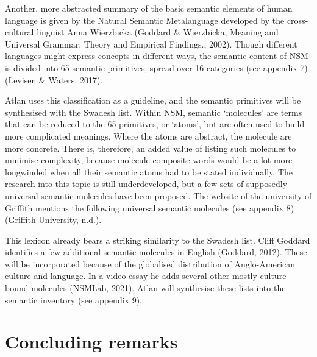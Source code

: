 Another, more abstracted summary of the basic semantic elements of human language is given by the Natural Semantic Metalanguage developed by the cross-cultural linguist Anna Wierzbicka (Goddard \& Wierzbicka, Meaning and Universal Grammar: Theory and Empirical Findings., 2002). Though different languages might express concepts in different ways, the semantic content of NSM is divided into 65 semantic primitives, spread over 16 categories (see appendix 7) (Levisen \& Waters, 2017). 

Atlan uses this classification as a guideline, and the semantic primitives will be synthesised with the Swadesh list. Within NSM, semantic ‘molecules’ are terms that can be reduced to the 65 primitives, or ‘atoms’, but are often used to build more complicated meanings. Where the atoms are abstract, the molecule are more concrete. There is, therefore, an added value of listing such molecules to minimise complexity, because molecule-composite words would be a lot more longwinded when all their semantic atoms had to be stated individually. The research into this topic is still underdeveloped, but a few sets of supposedly universal semantic molecules have been proposed. The website of the university of Griffith mentions the following universal semantic molecules (see appendix 8) (Griffith University, n.d.).  

This lexicon already bears a striking similarity to the Swadesh list. Cliff Goddard identifies a few additional semantic molecules in English (Goddard, 2012). These will be incorporated because of the globalised distribution of Anglo-American culture and language. In a video-essay he adds several other mostly culture-bound molecules (NSMLab, 2021). Atlan will synthesise these lists into the semantic inventory (see appendix 9).  

 

\section{Concluding remarks}

